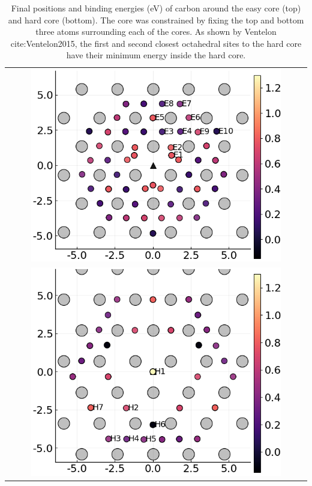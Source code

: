 \documentclass[a4paper]{article}
\begin{document}
{\begin{table}	
    \begin{tabular}{c}
 	          \includegraphics[width=0.85\textwidth]{../Images/easy_core_fe_C_positioning_energies_e10.png}  \\
 	          \includegraphics[width=0.85\textwidth]{../Images/hard_core_fe_C_positioning_energies_h7.png}  \\

     	     \end{tabular}		
\caption{ Final positions and binding energies (eV) of carbon around the easy core (top) and hard core (bottom). The core was constrained by fixing the top and bottom three atoms surrounding each of the cores. As shown by Ventelon cite:Ventelon2015, the first and second closest octahedral sites to the hard core have their minimum energy inside the hard core. }
   \end{table}


}
\end{document}
